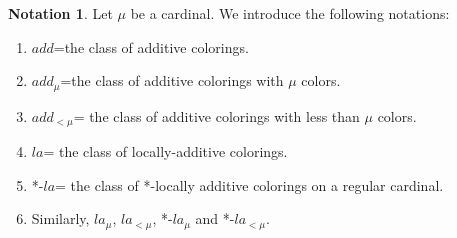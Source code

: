 \documentclass[11pt]{amsart}
\theoremstyle{plain}
\theoremstyle{definition} %
\newtheorem{notation}[theorem]{Notation}
\theoremstyle{remark}
\newcommand{\be}{\begin{enumerate}}
\newcommand{\ee}{\end{enumerate}}
\begin{document}
\begin{notation} Let $\mu$ be a cardinal. We introduce the following notations:
\be
\item $add$=the class of additive colorings.
\item $add_\mu$=the class of additive colorings with $\mu$ colors.
\item $add_{<\mu}$= the class of additive colorings with less than $\mu$ colors.
\item $la$= the class of locally-additive colorings.
\item *-$la$= the class of *-locally additive colorings on a regular cardinal.
\item Similarly, $la_\mu$, $la_{<\mu}$, *-$la_{\mu}$ and *-$la_{<\mu}$.
\ee
\end{notation}




\end{document}
